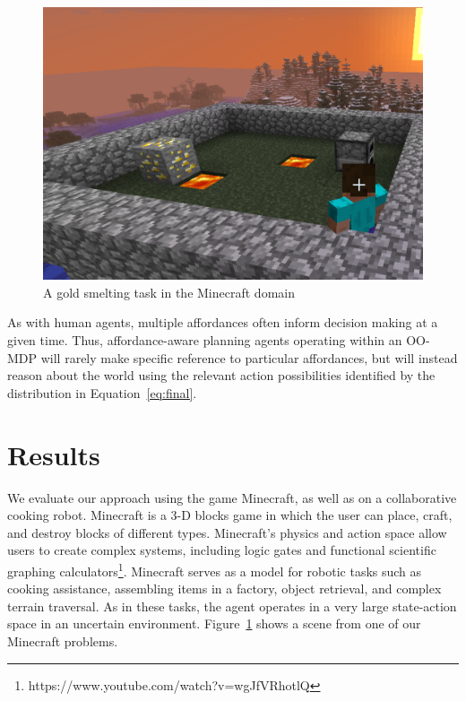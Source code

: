 \documentclass[letterpaper]{article}
\begin{document}
\begin{figure}
\centering
\includegraphics[scale=0.11]{figures/smelting.png}%
  \caption{A gold smelting task in the Minecraft domain}
  \label{fig:minecraft}
\end{figure}
As with human agents, multiple affordances often inform decision making at a given time.
Thus, affordance-aware planning agents operating within an OO-MDP will rarely make specific
reference to particular affordances, but will instead reason about the world using the relevant
action possibilities identified by the distribution in Equation~\ref{eq:final}.

\section{Results}
\label{sec:results}

We evaluate our approach using the game Minecraft, as well as on a
collaborative cooking robot.  Minecraft is a 3-D blocks game in which
the user can place, craft, and destroy blocks of different types.
Minecraft's physics and action space allow users to create complex
systems, including logic gates and functional scientific graphing
calculators\footnote{https://www.youtube.com/watch?v=wgJfVRhotlQ}.
Minecraft serves as a model for robotic tasks such as cooking
assistance, assembling items in a factory, object retrieval, and
complex terrain traversal.  As in these tasks, the agent operates in a
very large state-action space in an uncertain environment.
Figure~\ref{fig:minecraft} shows a scene from one of our Minecraft
problems.
\end{document}
